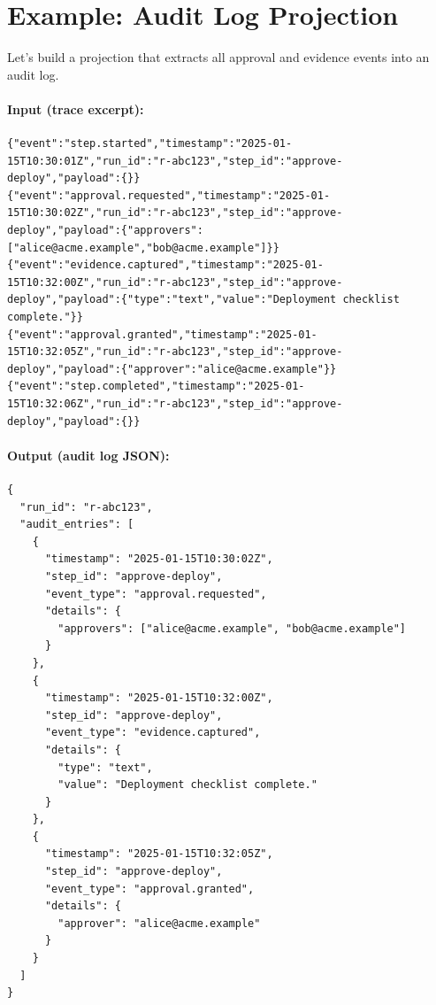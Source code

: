 \section{Example: Audit Log Projection}
\label{sec:example-audit-log}

Let's build a projection that extracts all approval and evidence events into an
audit log.

\paragraph{Input (trace excerpt):}

\begin{verbatim}
{"event":"step.started","timestamp":"2025-01-15T10:30:01Z","run_id":"r-abc123","step_id":"approve-deploy","payload":{}}
{"event":"approval.requested","timestamp":"2025-01-15T10:30:02Z","run_id":"r-abc123","step_id":"approve-deploy","payload":{"approvers":["alice@acme.example","bob@acme.example"]}}
{"event":"evidence.captured","timestamp":"2025-01-15T10:32:00Z","run_id":"r-abc123","step_id":"approve-deploy","payload":{"type":"text","value":"Deployment checklist complete."}}
{"event":"approval.granted","timestamp":"2025-01-15T10:32:05Z","run_id":"r-abc123","step_id":"approve-deploy","payload":{"approver":"alice@acme.example"}}
{"event":"step.completed","timestamp":"2025-01-15T10:32:06Z","run_id":"r-abc123","step_id":"approve-deploy","payload":{}}
\end{verbatim}

\paragraph{Output (audit log JSON):}

\begin{verbatim}
{
  "run_id": "r-abc123",
  "audit_entries": [
    {
      "timestamp": "2025-01-15T10:30:02Z",
      "step_id": "approve-deploy",
      "event_type": "approval.requested",
      "details": {
        "approvers": ["alice@acme.example", "bob@acme.example"]
      }
    },
    {
      "timestamp": "2025-01-15T10:32:00Z",
      "step_id": "approve-deploy",
      "event_type": "evidence.captured",
      "details": {
        "type": "text",
        "value": "Deployment checklist complete."
      }
    },
    {
      "timestamp": "2025-01-15T10:32:05Z",
      "step_id": "approve-deploy",
      "event_type": "approval.granted",
      "details": {
        "approver": "alice@acme.example"
      }
    }
  ]
}
\end{verbatim}

